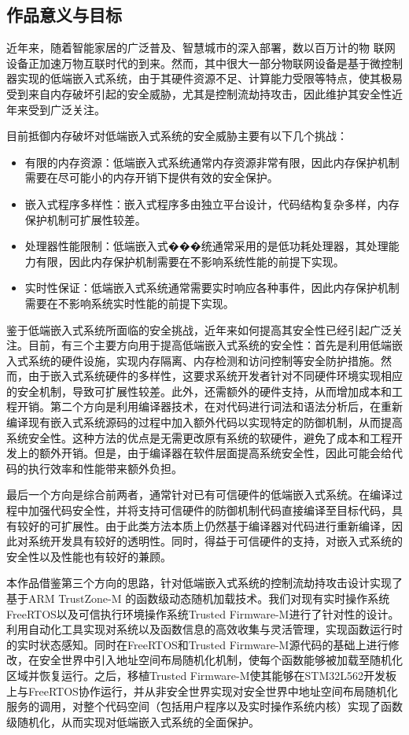 \documentclass[12pt,a4paper]{ctexart}
\numberwithin{figure}{section}
\begin{document}
\subsection{作品意义与目标}
\par 近年来，随着智能家居的广泛普及、智慧城市的深入部署，数以百万计的物 联网设备正加速万物互联时代的到来。然而，其中很大一部分物联网设备是基于微控制器实现的低端嵌入式系统，由于其硬件资源不足、计算能力受限等特点，使其极易受到来自内存破坏引起的安全威胁，尤其是控制流劫持攻击，因此维护其安全性近年来受到广泛关注。
\par 目前抵御内存破坏对低端嵌入式系统的安全威胁主要有以下几个挑战：
\begin{itemize}
    \item 有限的内存资源：低端嵌入式系统通常内存资源非常有限，因此内存保护机制需要在尽可能小的内存开销下提供有效的安全保护。
    \item 嵌入式程序多样性：嵌入式程序多由独立平台设计，代码结构复杂多样，内存保护机制可扩展性较差。
    \item 处理器性能限制：低端嵌入式���统通常采用的是低功耗处理器，其处理能力有限，因此内存保护机制需要在不影响系统性能的前提下实现。
    \item 实时性保证：低端嵌入式系统通常需要实时响应各种事件，因此内存保护机制需要在不影响系统实时性能的前提下实现。
\end{itemize}
\par 鉴于低端嵌入式系统所面临的安全挑战，近年来如何提高其安全性已经引起广泛关注。目前，有三个主要方向用于提高低端嵌入式系统的安全性：首先是利用低端嵌入式系统的硬件设施，实现内存隔离、内存检测和访问控制等安全防护措施。然而，由于嵌入式系统硬件的多样性，这要求系统开发者针对不同硬件环境实现相应的安全机制，导致可扩展性较差。此外，还需额外的硬件支持，从而增加成本和工程开销。第二个方向是利用编译器技术，在对代码进行词法和语法分析后，在重新编译现有嵌入式系统源码的过程中加入额外代码以实现特定的防御机制，从而提高系统安全性。这种方法的优点是无需更改原有系统的软硬件，避免了成本和工程开发上的额外开销。但是，由于编译器在软件层面提高系统安全性，因此可能会给代码的执行效率和性能带来额外负担。
\par 最后一个方向是综合前两者，通常针对已有可信硬件的低端嵌入式系统。在编译过程中加强代码安全性，并将支持可信硬件的防御机制代码直接编译至目标代码，具有较好的可扩展性。由于此类方法本质上仍然基于编译器对代码进行重新编译，因此对系统开发具有较好的透明性。同时，得益于可信硬件的支持，对嵌入式系统的安全性以及性能也有较好的兼顾。 
\par 本作品借鉴第三个方向的思路，针对低端嵌入式系统的控制流劫持攻击设计实现了基于ARM TrustZone-M 的函数级动态随机加载技术。我们对现有实时操作系统FreeRTOS以及可信执行环境操作系统Trusted Firmware-M进行了针对性的设计。利用自动化工具实现对系统以及函数信息的高效收集与灵活管理，实现函数运行时的实时状态感知。同时在FreeRTOS和Trusted Firmware-M源代码的基础上进行修改，在安全世界中引入地址空间布局随机化机制，使每个函数能够被加载至随机化区域并恢复运行。之后，移植Trusted Firmware-M使其能够在STM32L562开发板上与FreeRTOS协作运行，并从非安全世界实现对安全世界中地址空间布局随机化服务的调用，对整个代码空间（包括用户程序以及实时操作系统内核）实现了函数级随机化，从而实现对低端嵌入式系统的全面保护。
\end{document}
